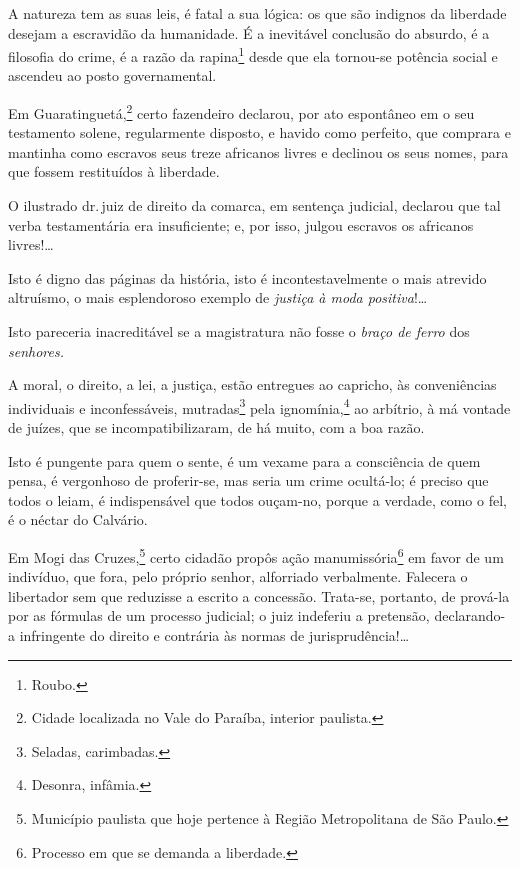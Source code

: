 A natureza tem as suas leis, é fatal a sua lógica: os que são indignos
da liberdade desejam a escravidão da humanidade. É a inevitável
conclusão do absurdo, é a filosofia do crime, é a razão da
rapina\footnote{Roubo.} desde que ela tornou-se potência social e
ascendeu ao posto governamental.

Em Guaratinguetá,\footnote{Cidade localizada no Vale do Paraíba,
  interior paulista.} certo fazendeiro declarou, por ato espontâneo em
o seu testamento solene, regularmente disposto, e havido como perfeito,
que comprara e mantinha como escravos seus treze africanos livres e
declinou os seus nomes, para que fossem restituídos à liberdade.

O ilustrado dr.\,juiz de direito da comarca, em sentença judicial,
declarou que tal verba testamentária era insuficiente; e, por isso,
julgou escravos os africanos livres!\ldots{}

Isto é digno das páginas da história, isto é incontestavelmente o mais
atrevido altruísmo, o mais esplendoroso exemplo de \emph{justiça à moda
positiva}!\ldots{}

Isto pareceria inacreditável se a magistratura não fosse o \emph{braço
de ferro} dos \emph{senhores.}

A moral, o direito, a lei, a justiça, estão entregues ao capricho, às
conveniências individuais e inconfessáveis, mutradas\footnote{Seladas,
  carimbadas.} pela ignomínia,\footnote{Desonra, infâmia.} ao
arbítrio, à má vontade de juízes, que se incompatibilizaram, de há
muito, com a boa razão.

Isto é pungente para quem o sente, é um vexame para a consciência de
quem pensa, é vergonhoso de proferir-se, mas seria um crime ocultá-lo; é
preciso que todos o leiam, é indispensável que todos ouçam-no, porque a
verdade, como o fel, é o néctar do Calvário.

Em Mogi das Cruzes,\footnote{Município paulista que hoje pertence à
  Região Metropolitana de São Paulo.} certo cidadão propôs ação
manumissória\footnote{Processo em que se demanda a liberdade.} em
favor de um indivíduo, que fora, pelo próprio senhor, alforriado
verbalmente. Falecera o libertador sem que reduzisse a escrito a
concessão. Trata-se, portanto, de prová-la por as fórmulas de um
processo judicial; o juiz indeferiu a pretensão, declarando-a
infringente do direito e contrária às normas de jurisprudência!\ldots{}

